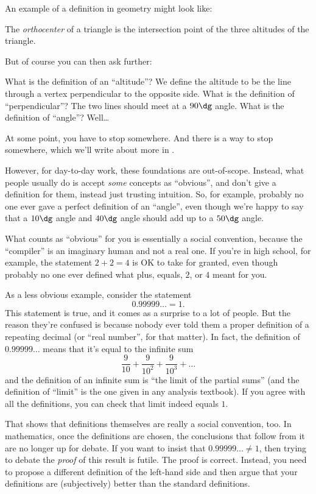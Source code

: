 \documentclass[11pt]{scrartcl}
\begin{document}
An example of a definition in geometry might look like:
\begin{definition}
  The \emph{orthocenter} of a triangle is the intersection
  point of the three altitudes of the triangle.
\end{definition}
But of course you can then ask further:
\begin{itemize}
  \ii What is the definition of an ``altitude''?
  We define the altitude to be the line
  through a vertex perpendicular to the opposite side.
  \ii What is the definition of ``perpendicular''?
  The two lines should meet at a $90\dg$ angle.
  \ii What is the definition of ``angle''? Well\dots
\end{itemize}
At some point, you have to stop somewhere.
And there is a way to stop somewhere,
which we'll write about more in .

However, \alert{for day-to-day work, these foundations are out-of-scope}.
Instead, what people usually do is accept \emph{some} concepts as ``obvious'',
and don't give a definition for them, instead just trusting intuition.
So, for example, probably no one ever gave a perfect definition of an ``angle'',
even though we're happy to say that a $10\dg$ angle and $40\dg$ angle
should add up to a $50\dg$ angle.

What counts as ``obvious'' for you is essentially a social convention,
because the ``compiler'' is an imaginary human and not a real one.
If you're in high school, for example, the statement $2+2=4$
is OK to take for granted, even though probably no one ever defined what
plus, equals, $2$, or $4$ meant for you.

As a less obvious example, consider the statement
\[ 0.99999\ldots = 1. \]
This statement is true, and it comes as a surprise to a lot of people.
But the reason they're confused is because nobody ever told them a
proper definition of a repeating decimal (or ``real number'', for that matter).
In fact, the definition of $0.99999\dots$ means
that it's equal to the infinite sum
\[ \frac{9}{10} + \frac{9}{10^2} + \frac{9}{10^3} + \dots \]
and the definition of an infinite sum is ``the limit of the partial sums''
(and the definition of ``limit'' is the one given in any analysis textbook).
If you agree with all the definitions, you can check that limit indeed equals $1$.

That shows that definitions themselves are really a social convention, too.
In mathematics, once the definitions are chosen,
the conclusions that follow from it are no longer up for debate.
If you want to insist that $0.99999\dots \neq 1$,
then trying to debate the \emph{proof} of this result is futile.
The proof is correct.
Instead, you need to propose a different definition of the left-hand side
and then argue that your definitions are (subjectively)
better than the standard definitions.
\end{document}
